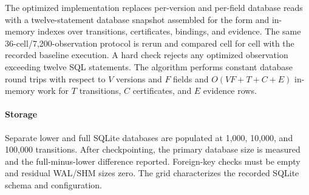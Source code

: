 The optimized implementation replaces per-version and per-field database reads with a twelve-statement database snapshot assembled for the form and in-memory indexes over transitions, certificates, bindings, and evidence. The same 36-cell/7,200-observation protocol is rerun and compared cell for cell with the recorded baseline execution. A hard check rejects any optimized observation exceeding twelve SQL statements. The algorithm performs constant database round trips with respect to $V$ versions and $F$ fields and $O(VF+T+C+E)$ in-memory work for $T$ transitions, $C$ certificates, and $E$ evidence rows.

\paragraph{Storage}
Separate lower and full SQLite databases are populated at 1,000, 10,000, and 100,000 transitions. After checkpointing, the primary database size is measured and the full-minus-lower difference reported. Foreign-key checks must be empty and residual WAL/SHM sizes zero. The grid characterizes the recorded SQLite schema and configuration.
